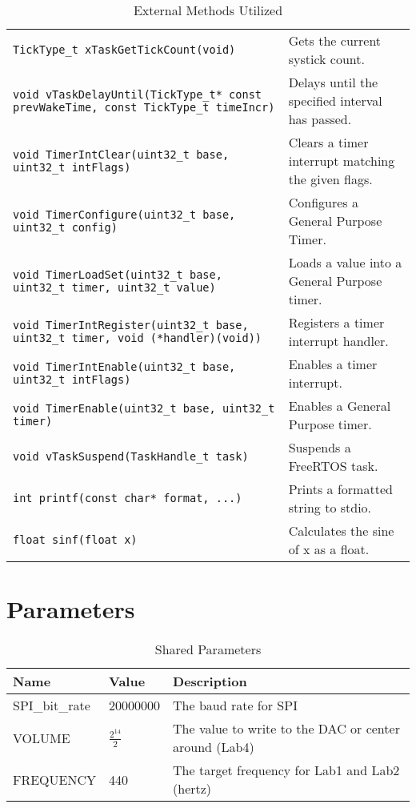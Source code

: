 \documentclass[titlepage]{article}
\begin{document}
\begin{table}
\begin{tabular}{ | p{7cm} | p{5.5cm} | }
        \texttt{TickType\_t xTaskGetTickCount(void)} & Gets the current systick count.\\
        \texttt{void vTaskDelayUntil(TickType\_t* const prevWakeTime, const TickType\_t timeIncr)} & Delays until the specified interval has passed. \\
        \texttt{void TimerIntClear(uint32\_t base, uint32\_t intFlags)} & Clears a timer interrupt matching the given flags. \\
        \texttt{void TimerConfigure(uint32\_t base, uint32\_t config)} & Configures a General Purpose Timer. \\
        \texttt{void TimerLoadSet(uint32\_t base, uint32\_t timer, uint32\_t value)} & Loads a value into a General Purpose timer. \\
        \texttt{void TimerIntRegister(uint32\_t base, uint32\_t timer, void (*handler)(void))} & Registers a timer interrupt handler. \\
        \texttt{void TimerIntEnable(uint32\_t base, uint32\_t intFlags)} & Enables a timer interrupt. \\
        \texttt{void TimerEnable(uint32\_t base, uint32\_t timer)} & Enables a General Purpose timer. \\
        \texttt{void vTaskSuspend(TaskHandle\_t task)} & Suspends a FreeRTOS task. \\
        \texttt{int printf(const char* format, ...)} & Prints a formatted string to stdio. \\
        \texttt{float sinf(float x)} & Calculates the sine of x as a float. \\
        \hline
    \end{tabular}
    \caption{External Methods Utilized}    
\end{table}

\pagebreak
\section{Parameters}
\begin{table}[H]
    \begin{tabular}{| l | l | p{4cm} |}
        \hline
        \textbf{Name} & \textbf{Value} & \textbf{Description} \\
        \hline
        SPI\_bit\_rate & 20000000 & The baud rate for SPI \\
        VOLUME & $\frac{2^{14}}{2}$ & The value to write to the DAC or center around (Lab4) \\
        FREQUENCY & 440 & The target frequency for Lab1 and Lab2 (hertz) \\
        \hline
    \end{tabular}
    \caption{Shared Parameters}
\end{table}
\end{document}
